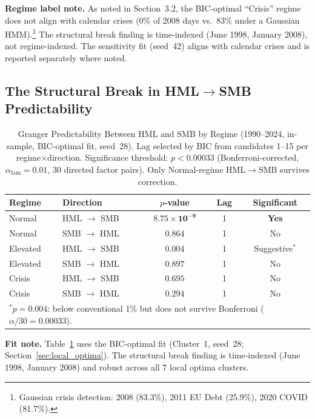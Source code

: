 \documentclass[sigconf,anonymous]{acmart}
\begin{document}
\textbf{Regime label note.}\label{sec:gaussian_comparison} As noted in
Section~3.2, the BIC-optimal ``Crisis'' regime does not align with calendar
crises (0\% of 2008 days vs.\ 83\% under a Gaussian HMM).\footnote{Gaussian
crisis detection: 2008 (83.3\%), 2011 EU Debt (25.9\%), 2020 COVID (81.7\%).}
The structural break finding is time-indexed (June 1998, January 2008),
not regime-indexed. The sensitivity fit (seed~42) aligns with calendar crises
and is reported separately where noted.

\subsection{The Structural Break in HML$\to$SMB Predictability}
\label{sec:main_result}

\begin{table}[t]
\centering
\caption{Granger Predictability Between HML and SMB by Regime (1990--2024, in-sample,
BIC-optimal fit, seed~28). Lag selected by BIC from candidates 1--15 per
regime$\times$direction. Significance threshold:
$p < 0.00033$ (Bonferroni-corrected, $\alpha_{\text{fam}} = 0.01$, 30 directed factor pairs).
Only Normal-regime HML$\to$SMB survives correction.}
\label{tab:main}
\small
\begin{tabular}{llccc}
\toprule
Regime & Direction & $p$-value & Lag & Significant \\
\midrule
Normal & HML $\to$ SMB & $\mathbf{8.75 \times 10^{-9}}$ & 1 & \textbf{Yes} \\
Normal & SMB $\to$ HML & $0.864$ & 1 & No \\
\midrule
Elevated & HML $\to$ SMB & $0.004$ & 1 & Suggestive$^*$ \\
Elevated & SMB $\to$ HML & $0.897$ & 1 & No \\
\midrule
Crisis & HML $\to$ SMB & $0.695$ & 1 & No \\
Crisis & SMB $\to$ HML & $0.294$ & 1 & No \\
\bottomrule
\multicolumn{5}{l}{\footnotesize $^*$$p = 0.004$: below conventional 1\% but does not survive Bonferroni ($\alpha/30 = 0.00033$).}
\end{tabular}
\end{table}

\textbf{Fit note.} Table~\ref{tab:main} uses the BIC-optimal fit (Cluster~1, seed~28; Section~\ref{sec:local_optima}). The structural break finding is time-indexed (June 1998, January 2008) and robust across all 7 local optima clusters.
\end{document}
